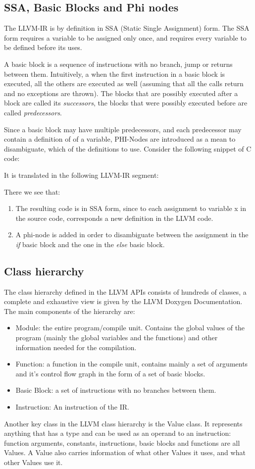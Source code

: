 \subsection{SSA, Basic Blocks and Phi nodes}
The LLVM-IR is by definition in SSA (Static Single Assignment) form. The SSA form requires a variable to be assigned only once, and requires every variable to be defined before its uses. \par 
A basic block is a sequence of instructions with no branch, jump or returns between them. Intuitively, a when the first instruction in a basic block is executed, all the others are executed as well (assuming that all the calls return and no exceptions are thrown). The blocks that are possibly executed after a block are called its \emph{successors}, the blocks that were possibly executed before are called \emph{predecessors}. \par 
Since a basic block may have multiple predecessors, and each predecessor may contain a definition of of a variable, PHI-Nodes are introduced as a mean to disambiguate, which of the definitions to use.
Consider the following snippet of C code:

It is translated in the following LLVM-IR segment:

There we see that:
\begin{enumerate}
\item The resulting code is in SSA form, since to each assignment to variable x in the source code, corresponds a new definition in the LLVM code.
\item A phi-node is added in order to disambiguate between the assignment in the \emph{if} basic block and the one in the \emph{else} basic block.
\end{enumerate}

\subsection{Class hierarchy}
The class hierarchy defined in the LLVM APIs consists of hundreds of classes, a complete and exhaustive view is given by the LLVM Doxygen Documentation. The main components of the hierarchy are:
\begin{itemize}
\item Module: the entire program/compile unit. Contains the global values of the program (mainly the global variables and the functions) and other information needed for the compilation.
\item Function: a function in the compile unit, contains mainly a set of arguments and it's control flow graph in the form of a set of basic blocks.
\item Basic Block: a set of instructions with no branches between them.
\item Instruction: An instruction of the IR.
\end{itemize}
Another key class in the LLVM class hierarchy is the Value class. It represents anything that has a type and can be used as an operand to an instruction: function arguments, constants, instructions, basic blocks and functions are all Values.
A Value also carries information of what other Values it uses, and what other Values use it.

